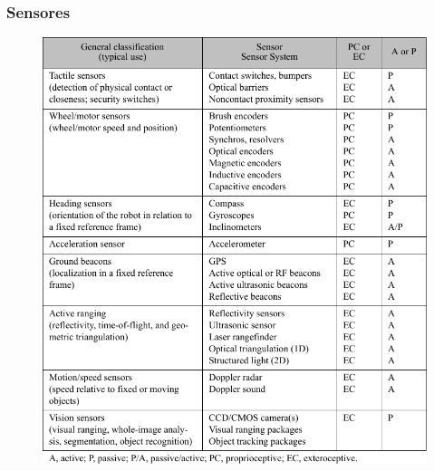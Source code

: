 \begin{frame}
    \frametitle{Sensores}
    
        
    \begin{figure}[!h]
        \centering
        \includegraphics[height=0.9\textheight]{images/sensors_table.pdf}
    \end{figure}
    

\end{frame}



